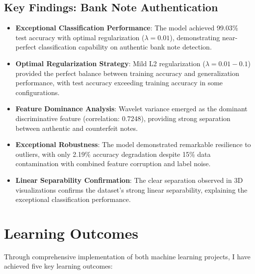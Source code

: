 \documentclass[12pt,a4paper]{article}
\begin{document}
\newpage

\subsection{Key Findings: Bank Note Authentication}
\begin{itemize}
\item \textbf{Exceptional Classification Performance}: The model achieved 99.03\% test accuracy with optimal regularization ($\lambda=0.01$), demonstrating near-perfect classification capability on authentic bank note detection.

\item \textbf{Optimal Regularization Strategy}: Mild L2 regularization ($\lambda=0.01-0.1$) provided the perfect balance between training accuracy and generalization performance, with test accuracy exceeding training accuracy in some configurations.

\item \textbf{Feature Dominance Analysis}: Wavelet variance emerged as the dominant discriminative feature (correlation: 0.7248), providing strong separation between authentic and counterfeit notes.

\item \textbf{Exceptional Robustness}: The model demonstrated remarkable resilience to outliers, with only 2.19\% accuracy degradation despite 15\% data contamination with combined feature corruption and label noise.

\item \textbf{Linear Separability Confirmation}: The clear separation observed in 3D visualizations confirms the dataset's strong linear separability, explaining the exceptional classification performance.
\end{itemize}

\section{Learning Outcomes}

Through comprehensive implementation of both machine learning projects, I have achieved five key learning outcomes:
\end{document}
